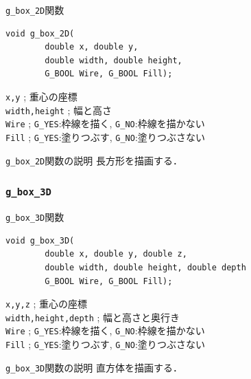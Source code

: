 \documentclass[platex,a4paper,12pt]{jsarticle}%
\begin{document}
\begin{itembox}[l]{\texttt{g\_box\_2D}関数}
\begin{verbatim}
void g_box_2D(
        double x, double y,
        double width, double height,
        G_BOOL Wire, G_BOOL Fill);    
\end{verbatim}
\verb|x,y| ; 重心の座標\\
\verb|width,height| ; 幅と高さ\\
\verb|Wire| ; \verb|G_YES|:枠線を描く, \verb|G_NO|:枠線を描かない \\
\verb|Fill| ; \verb|G_YES|:塗りつぶす, \verb|G_NO|:塗りつぶさない
\end{itembox}

\begin{itembox}[l]{\texttt{g\_box\_2D}関数の説明}
長方形を描画する．
\end{itembox}


\subsubsection{\texttt{g\_box\_3D}}

\begin{itembox}[l]{\texttt{g\_box\_3D}関数}
\begin{verbatim}
void g_box_3D(
        double x, double y, double z,
        double width, double height, double depth
      	G_BOOL Wire, G_BOOL Fill);   
\end{verbatim}
\verb|x,y,z| ; 重心の座標\\
\verb|width,height,depth| ; 幅と高さと奥行き\\
\verb|Wire| ; \verb|G_YES|:枠線を描く, \verb|G_NO|:枠線を描かない \\
\verb|Fill| ; \verb|G_YES|:塗りつぶす, \verb|G_NO|:塗りつぶさない
\end{itembox}

\begin{itembox}[l]{\texttt{g\_box\_3D}関数の説明}
直方体を描画する．
\end{itembox}
\end{document}
